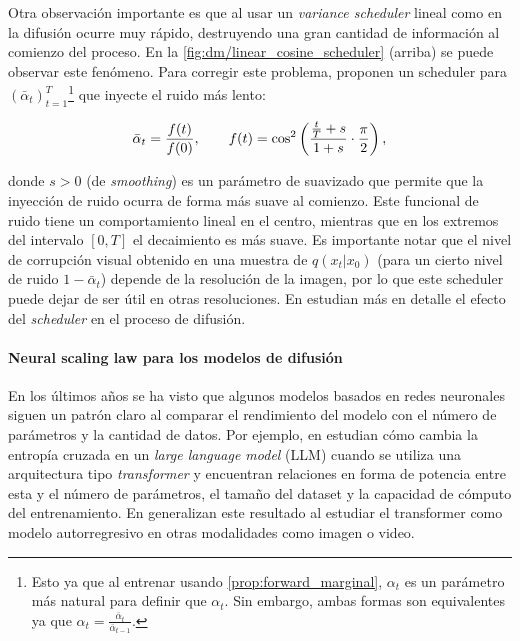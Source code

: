 Otra observación importante es que al usar un \textit{variance scheduler} lineal como en \cite{ho2020denoising} la difusión ocurre muy rápido, destruyendo una gran cantidad de información al comienzo del proceso. En la \autoref{fig:dm/linear_cosine_scheduler} (arriba) se puede observar este fenómeno. Para corregir este problema, proponen un scheduler para $(\bar\alpha_t)_{t=1}^T$\footnote{Esto ya que al entrenar usando \eqref{prop:forward_marginal}, $\alpha_t$ es un parámetro más natural para definir que $\alpha_t$. Sin embargo, ambas formas son equivalentes ya que $\alpha_t=\frac{\bar\alpha_t}{\bar\alpha_{t-1}}$.} que inyecte el ruido más lento:

\begin{equation*}
    \bar\alpha_t = \frac{f(t)}{f(0)},\qquad f(t)=\cos^2\left(\frac{\frac{t}{T}+s}{1+s}\cdot\frac{\pi}{2}\right) ,
\end{equation*}


donde $s>0$ (de \textit{smoothing}) es un parámetro de suavizado que permite que la inyección de ruido ocurra de forma más suave al comienzo. Este funcional de ruido tiene un comportamiento lineal en el centro, mientras que en los extremos del intervalo $[0,T]$ el decaimiento es más suave. Es importante notar que el nivel de corrupción visual obtenido en una muestra de $q(x_t|x_0)$ (para un cierto nivel de ruido $1-\bar\alpha_t$) depende de la resolución de la imagen, por lo que este scheduler puede dejar de ser útil en otras resoluciones. En \cite{chen2023importancenoiseschedulingdiffusion} estudian más en detalle el efecto del \textit{scheduler} en el proceso de difusión.

\paragraph{Neural scaling law para los modelos de difusión}

En los últimos años se ha visto que algunos modelos basados en redes neuronales siguen un patrón claro al comparar el rendimiento del modelo con el número de parámetros y la cantidad de datos. Por ejemplo, en \cite{kaplan2020scaling} estudian cómo cambia la entropía cruzada en un \textit{large language model} (LLM) cuando se utiliza una arquitectura tipo \textit{transformer} y encuentran relaciones en forma de potencia entre esta y el número de parámetros, el tamaño del dataset y la capacidad de cómputo del entrenamiento. En \cite{farhani2022momentum} generalizan este resultado al estudiar el transformer como modelo autorregresivo en otras modalidades como imagen o video.

